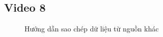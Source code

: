 \documentclass{article}
\begin{document}






\subsection{Video 8}
\begin{figure}[H]
\centering
\caption{Hướng dẫn sao chép dữ liệu từ nguồn khác}
\end{figure}

\end{document}
